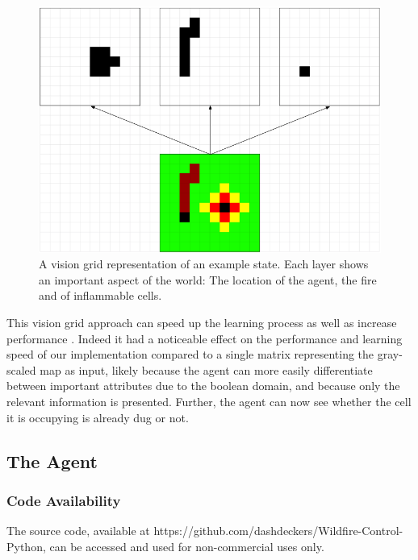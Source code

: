 \begin{figure}[h]
    \centering
    \includegraphics[width=1\linewidth]{img/Vision_Grid.png}
    \caption{A vision grid representation of an example state. Each layer shows an important aspect of the world: The location of the agent, the fire and of inflammable cells.}
    \label{fig:visiongrid}
\end{figure}

This vision grid approach can speed up the learning process as well as increase performance \citep{knegt2018opponent}. Indeed it had a noticeable effect on the performance and learning speed of our implementation compared to a single matrix representing the gray-scaled map as input, likely because the agent can more easily differentiate between important attributes due to the boolean domain, and because only the relevant information is presented. Further, the agent can now see whether the cell it is occupying is already dug or not.


\subsection{The Agent}\label{sec:agent}

\subsubsection{Code Availability}
The source code, available at https://github.com/dashdeckers/Wildfire-Control-Python, can be accessed and used for non-commercial uses only.

